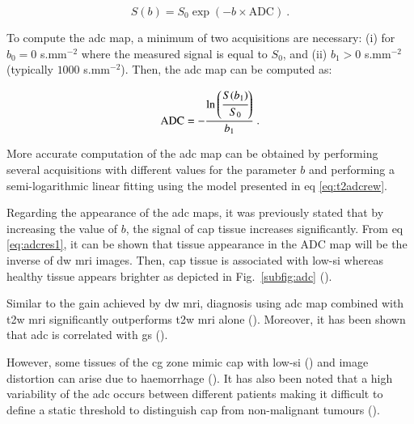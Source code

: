 \begin{enumerate}[leftmargin=*]
\begin{equation}
	S(b) = S_0 \exp \left( -b \times \text{ADC} \right) \ .
	\label{eq:t2adcrew}
\end{equation}

To compute the \ac{adc} map, a minimum of two acquisitions are necessary: (i) for $b_0=0$ s.mm$^{-2}$ where the measured signal is equal to $S_0$, and (ii) $b_1>0$ s.mm$^{-2}$ (typically $1000$ s.mm$^{-2}$). Then, the \ac{adc} map can be computed as:

\begin{equation}
	\text{ADC} = - \frac{\ln \left( \cfrac{S(b_1)}{S_0} \right) }{b_1} \ .
	\label{eq:adcres1}
\end{equation}

More accurate computation of the \ac{adc} map can be obtained by performing several acquisitions with different values for the parameter $b$ and performing a semi-logarithmic linear fitting using the model presented in \acs{eq} \eqref{eq:t2adcrew}.

Regarding the appearance of the \ac{adc} maps, it was previously stated that by increasing the value of $b$, the signal of \ac{cap} tissue increases significantly. From \acs{eq} \eqref{eq:adcres1}, it can be shown that tissue appearance in the ADC map will be the inverse of \ac{dw} \ac{mri} images. Then, \ac{cap} tissue is associated with low-\ac{si} whereas healthy tissue appears brighter as depicted in Fig.~\ref{subfig:adc} (\cite{Barentsz2012}).

Similar to the gain achieved by \ac{dw} \ac{mri}, diagnosis using \ac{adc} map combined with \ac{t2w} \ac{mri} significantly outperforms \ac{t2w} \ac{mri} alone (\cite{Doo2012,Choi2007}). Moreover, it has been shown that \ac{adc} is correlated with \ac{gs} (\cite{Hambrock2011, Itou2011, Peng2013}).

However, some tissues of the \ac{cg} zone mimic \ac{cap} with low-\ac{si} (\cite{Kirkham2006}) and image distortion can arise due to haemorrhage (\cite{Choi2007}). It has also been noted that a high variability of the \ac{adc} occurs between different patients making it difficult to define a static threshold to distinguish \ac{cap} from non-malignant tumours (\cite{Choi2007}). 


\end{enumerate}
